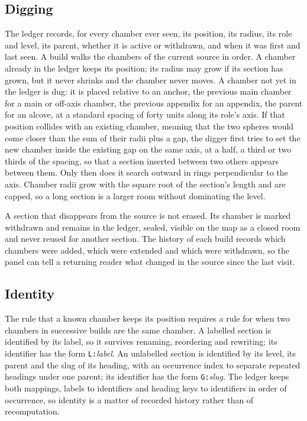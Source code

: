 \documentclass[11pt]{article}
\theoremstyle{remark}
\begin{document}
\subsection{Digging}

The ledger records, for every chamber ever seen, its position, its radius, its role and level, its parent, whether it is active or withdrawn, and when it was first and last seen. A build walks the chambers of the current source in order. A chamber already in the ledger keeps its position; its radius may grow if its section has grown, but it never shrinks and the chamber never moves. A chamber not yet in the ledger is dug: it is placed relative to an anchor, the previous main chamber for a main or off-axis chamber, the previous appendix for an appendix, the parent for an alcove, at a standard spacing of forty units along its role's axis. If that position collides with an existing chamber, meaning that the two spheres would come closer than the sum of their radii plus a gap, the digger first tries to set the new chamber inside the existing gap on the same axis, at a half, a third or two thirds of the spacing, so that a section inserted between two others appears between them. Only then does it search outward in rings perpendicular to the axis. Chamber radii grow with the square root of the section's length and are capped, so a long section is a larger room without dominating the level.

A section that disappears from the source is not erased. Its chamber is marked withdrawn and remains in the ledger, sealed, visible on the map as a closed room and never reused for another section. The history of each build records which chambers were added, which were extended and which were withdrawn, so the panel can tell a returning reader what changed in the source since the last visit.

\subsection{Identity}

The rule that a known chamber keeps its position requires a rule for when two chambers in successive builds are the same chamber. A labelled section is identified by its label, so it survives renaming, reordering and rewriting; its identifier has the form \texttt{L:}\emph{label}. An unlabelled section is identified by its level, its parent and the slug of its heading, with an occurrence index to separate repeated headings under one parent; its identifier has the form \texttt{G:}\emph{slug}. The ledger keeps both mappings, labels to identifiers and heading keys to identifiers in order of occurrence, so identity is a matter of recorded history rather than of recomputation.
\end{document}
